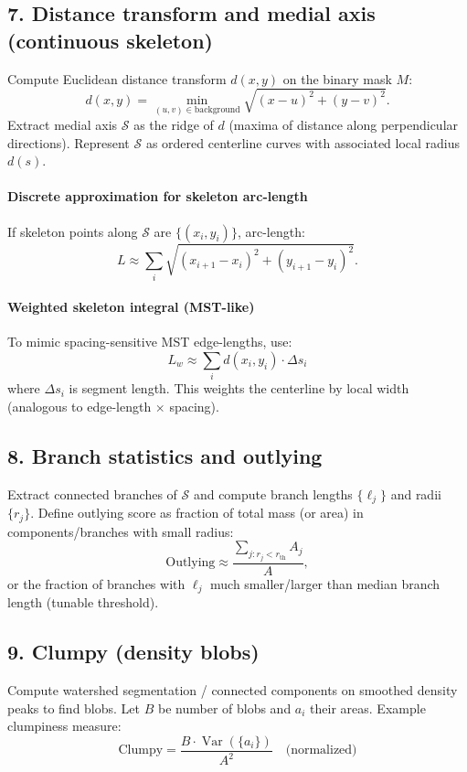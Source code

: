 \documentclass[11pt]{article}
\begin{document}
\subsection{7. Distance transform and medial axis (continuous skeleton)}
Compute Euclidean distance transform \(d(x,y)\) on the binary mask \(M\):
\[
d(x,y) = \min_{(u,v)\in \text{background}} \sqrt{(x-u)^2 + (y-v)^2}.
\]
Extract medial axis \(\mathcal{S}\) as the ridge of \(d\) (maxima of distance along perpendicular directions). Represent \(\mathcal{S}\) as ordered centerline curves with associated local radius \(d(s)\).

\paragraph{Discrete approximation for skeleton arc-length}
If skeleton points along \(\mathcal{S}\) are \(\{(x_i,y_i)\}\), arc-length:
\[
L \approx \sum_{i} \sqrt{(x_{i+1}-x_i)^2 + (y_{i+1}-y_i)^2}.
\]

\paragraph{Weighted skeleton integral (MST-like)}
To mimic spacing-sensitive MST edge-lengths, use:
\[
L_w \approx \sum_{i} d(x_i,y_i)\cdot \Delta s_i
\]
where \(\Delta s_i\) is segment length. This weights the centerline by local width (analogous to edge-length \(\times\) spacing).

\subsection{8. Branch statistics and outlying}
Extract connected branches of \(\mathcal{S}\) and compute branch lengths \(\{\ell_j\}\) and radii \(\{r_j\}\).
Define outlying score as fraction of total mass (or area) in components/branches with small radius:
\[
\text{Outlying} \approx \frac{\sum_{j: r_j < r_{\mathrm{th}}} A_j}{A},
\]
or the fraction of branches with \(\ell_j\) much smaller/larger than median branch length (tunable threshold).

\subsection{9. Clumpy (density blobs)}
Compute watershed segmentation / connected components on smoothed density peaks to find blobs. Let \(B\) be number of blobs and \(a_i\) their areas. Example clumpiness measure:
\[
\text{Clumpy} = \frac{B\cdot \operatorname{Var}(\{a_i\})}{A^2} \quad \text{(normalized)}
\]
\end{document}
